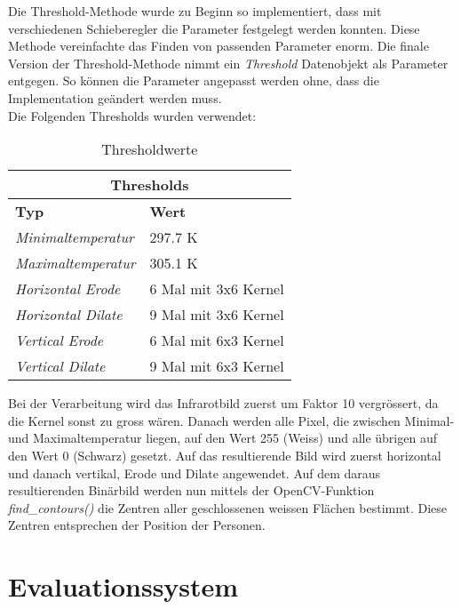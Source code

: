 Die Threshold-Methode wurde zu Beginn so implementiert, dass mit verschiedenen Schieberegler die Parameter festgelegt werden konnten. Diese Methode vereinfachte das Finden von passenden Parameter enorm. Die finale Version der Threshold-Methode nimmt ein \textit{Threshold} Datenobjekt als Parameter entgegen. So können die Parameter angepasst werden ohne, dass die Implementation geändert werden muss.\\
Die Folgenden Thresholds wurden verwendet:

{
	\renewcommand{\arraystretch}{1.3}

	\begin{table}[H]
		\scriptsize
		\centering
		\begin{tabularx}{.6\textwidth}{XX}\\
			\multicolumn{2}{c}{\textbf{Thresholds}}\\
			\hline
			\textbf{Typ} & \textbf{Wert}\\
			\hline
			\textit{Minimaltemperatur} & 297.7 K\\
			\hline
			\textit{Maximaltemperatur} & 305.1 K\\
			\hline 
			\textit{Horizontal \gls{Erode}} & 6 Mal mit 3x6 Kernel\\
			\hline
			\textit{Horizontal \gls{Dilate}} & 9 Mal mit 3x6 Kernel\\
			\hline
			\textit{Vertical \gls{Erode}} & 6 Mal mit 6x3 Kernel\\
			\hline
			\textit{Vertical \gls{Dilate}} & 9  Mal mit 6x3 Kernel\\
			\hline
		\end{tabularx}
		\caption{Thresholdwerte}
		\label{tbl:thresholds}
	\end{table}
}

\noindent
Bei der Verarbeitung wird das Infrarotbild zuerst um Faktor 10 vergrössert, da die Kernel sonst zu gross wären. Danach werden alle Pixel, die zwischen Minimal- und Maximaltemperatur liegen, auf den Wert 255 (Weiss) und alle übrigen auf den Wert 0 (Schwarz) gesetzt. Auf das resultierende Bild wird zuerst horizontal und danach vertikal, \gls{Erode} und \gls{Dilate} angewendet. Auf dem daraus resultierenden Binärbild werden nun mittels der OpenCV-Funktion \textit{find\_contours()} die Zentren aller geschlossenen weissen Flächen bestimmt. Diese Zentren entsprechen der Position der Personen.


\section{Evaluationssystem}

